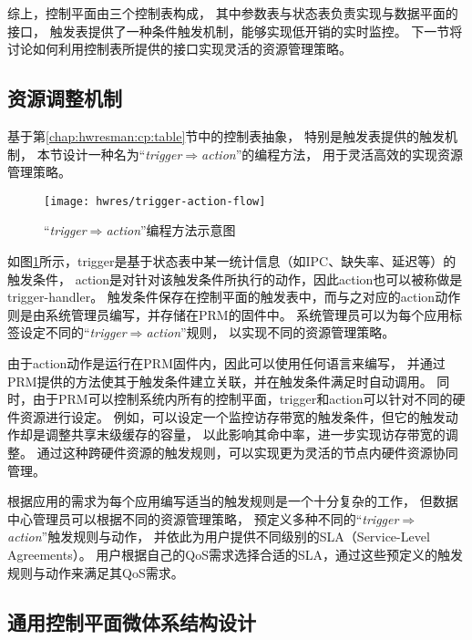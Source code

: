 综上，控制平面由三个控制表构成，
其中参数表与状态表负责实现与数据平面的接口，
触发表提供了一种条件触发机制，能够实现低开销的实时监控。
下一节将讨论如何利用控制表所提供的接口实现灵活的资源管理策略。


\subsection{资源调整机制}

基于第\ref{chap:hwresman:cp:table}节中的控制表抽象，
特别是触发表提供的触发机制，
本节设计一种名为``\emph{trigger$\Rightarrow$action}''的编程方法，
用于灵活高效的实现资源管理策略。

\begin{figure}[htb]
  \centering
  \texttt{[image: hwres/trigger-action-flow]}
  \caption{``\emph{trigger$\Rightarrow$action}''编程方法示意图}
  \label{fig:trigger-action-flow}
\end{figure}

如图\ref{fig:trigger-action-flow}所示，trigger是基于状态表中某一统计信息（如IPC、缺失率、延迟等）的触发条件，
action是对针对该触发条件所执行的动作，因此action也可以被称做是trigger-handler。
触发条件保存在控制平面的触发表中，而与之对应的action动作则是由系统管理员编写，并存储在PRM的固件中。
系统管理员可以为每个应用标签设定不同的``\emph{trigger$\Rightarrow$action}''规则，
以实现不同的资源管理策略。

由于action动作是运行在PRM固件内，因此可以使用任何语言来编写，
并通过PRM提供的方法使其于触发条件建立关联，并在触发条件满足时自动调用。
同时，由于PRM可以控制系统内所有的控制平面，trigger和action可以针对不同的硬件资源进行设定。
例如，可以设定一个监控访存带宽的触发条件，但它的触发动作却是调整共享末级缓存的容量，
以此影响其命中率，进一步实现访存带宽的调整。
通过这种跨硬件资源的触发规则，可以实现更为灵活的节点内硬件资源协同管理。

根据应用的需求为每个应用编写适当的触发规则是一个十分复杂的工作，
但数据中心管理员可以根据不同的资源管理策略，
预定义多种不同的``\emph{trigger$\Rightarrow$action}''触发规则与动作，
并依此为用户提供不同级别的SLA（Service-Level Agreements）。
用户根据自己的QoS需求选择合适的SLA，通过这些预定义的触发规则与动作来满足其QoS需求。


\subsection{通用控制平面微体系结构设计}

